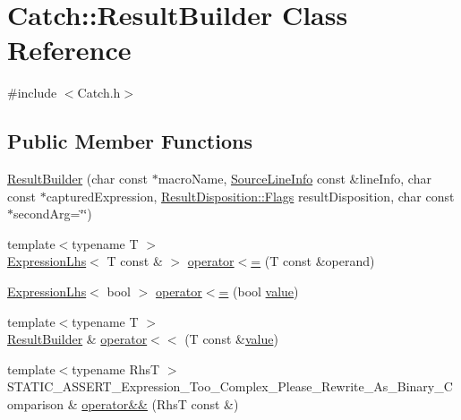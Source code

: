 \hypertarget{class_catch_1_1_result_builder}{}\section{Catch\+:\+:Result\+Builder Class Reference}
\label{class_catch_1_1_result_builder}


{\ttfamily \#include $<$Catch.\+h$>$}

\subsection*{Public Member Functions}
\begin{DoxyCompactItemize}
\item 
\hyperlink{class_catch_1_1_result_builder_a8579c3056f64f9324cf1181532828376}{Result\+Builder} (char const $\ast$macro\+Name, \hyperlink{struct_catch_1_1_source_line_info}{Source\+Line\+Info} const \&line\+Info, char const $\ast$captured\+Expression, \hyperlink{struct_catch_1_1_result_disposition_a3396cad6e2259af326b3aae93e23e9d8}{Result\+Disposition\+::\+Flags} result\+Disposition, char const $\ast$second\+Arg=\char`\"{}\char`\"{})
\item 
{\footnotesize template$<$typename T $>$ }\\\hyperlink{class_catch_1_1_expression_lhs}{Expression\+Lhs}$<$ T const \& $>$ \hyperlink{class_catch_1_1_result_builder_a1829db87e701758c4c520988883b25b5}{operator$<$=} (T const \&operand)
\item 
\hyperlink{class_catch_1_1_expression_lhs}{Expression\+Lhs}$<$ bool $>$ \hyperlink{class_catch_1_1_result_builder_a3b87b20bcd1ef9e630880e59eeefba2a}{operator$<$=} (bool \hyperlink{_s_d_l__opengl__glext_8h_a8ad81492d410ff2ac11f754f4042150f}{value})
\item 
{\footnotesize template$<$typename T $>$ }\\\hyperlink{class_catch_1_1_result_builder}{Result\+Builder} \& \hyperlink{class_catch_1_1_result_builder_a5aa79ce6160ab8cd800eb65bbd7a28a4}{operator$<$$<$} (T const \&\hyperlink{_s_d_l__opengl__glext_8h_a8ad81492d410ff2ac11f754f4042150f}{value})
\item 
{\footnotesize template$<$typename RhsT $>$ }\\S\+T\+A\+T\+I\+C\+\_\+\+A\+S\+S\+E\+R\+T\+\_\+\+Expression\+\_\+\+Too\+\_\+\+Complex\+\_\+\+Please\+\_\+\+Rewrite\+\_\+\+As\+\_\+\+Binary\+\_\+\+Comparison \& \hyperlink{class_catch_1_1_result_builder_a2bbd6b026765202aee224a14d24c68bc}{operator\&\&} (RhsT const \&)

\end{DoxyCompactItemize}
